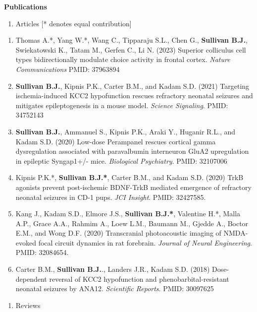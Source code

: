 \documentclass{resume} %
\begin{document}
\begin{rSection}{{\bfseries Publications}}

    \begin{enumerate}[resume, leftmargin=0pt]
        \item [] Articles [* denotes equal contribution]
         \end{enumerate}

    \begin{enumerate}[resume, leftmargin=2em]
        \item Thomas A.*, Yang W.*, Wang C., Tipparaju S.L., Chen G., {\bfseries Sullivan B.J.}, Swiekatowski K., Tatam M., Gerfen C., Li N. (2023) Superior colliculus cell types bidirectionally modulate choice activity in frontal cortex. \emph{Nature Communications} PMID: 37963894
        \item {\bfseries Sullivan B.J.}, Kipnis P.K., Carter B.M., and Kadam S.D. (2021) Targeting ischemia-induced KCC2 hypofunction rescues refractory neonatal seizures and mitigates epileptogenesis in a mouse model. \emph{Science Signaling}. PMID: 34752143
        \item {\bfseries Sullivan B.J.}, Ammanuel S., Kipnis P.K., Araki Y., Huganir R.L., and Kadam S.D. (2020) Low-dose Perampanel rescues cortical gamma dysregulation associated with paravalbumin interneuron GluA2 upregulation in epileptic Syngap1+/- mice. \emph{Biological Psychiatry}. PMID: 32107006
        \item Kipnis P.K.*, {\bfseries Sullivan B.J.*}, Carter B.M., and Kadam S.D. (2020) TrkB agonists prevent post-ischemic BDNF-TrkB mediated emergence of refractory neonatal seizures in CD-1 pups. \emph{JCI Insight}. PMID: 32427585. 
        \item Kang J., Kadam S.D., Elmore J.S., {\bfseries Sullivan B.J.*}, Valentine H.*, Malla A.P., Grace A.A., Rahmim A., Loew L.M., Baumann M., Gjedde A., Boctor E.M., and Wong D.F. (2020) Transcranial photoacoustic imaging of NMDA-evoked focal circuit dynamics in rat forebrain. \emph{Journal of Neural Engineering}. PMID: 32084654. 
        \item Carter B.M., {\bfseries Sullivan B.J.}., Landers J.R., Kadam S.D. (2018) Dose-dependent reversal of KCC2 hypofunction and phenobarbital-resistant neonatal seizures by ANA12. \emph{Scientific Reports}. PMID: 30097625
    \end{enumerate}
    \begin{enumerate}[leftmargin=0pt]
        \item [] Reviews
    \end{enumerate}


\end{rSection}
\end{document}
